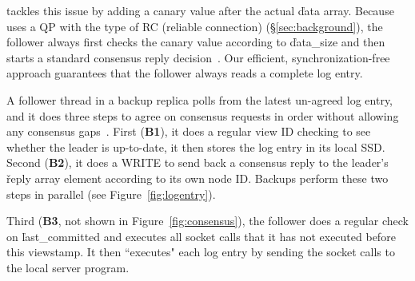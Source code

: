 \xxx tackles this issue by adding a canary value after the actual \v{data} 
array. Because \xxx uses a QP with the type of RC (reliable connection) 
(\S\ref{sec:background}), the follower always first checks the canary value 
according to \v{data\_size} and then starts a standard \paxos consensus reply 
decision~\cite{paxos:practical}. Our efficient, synchronization-free approach 
guarantees that the follower always reads a complete log entry.
% 

A follower thread in a backup replica polls from the latest un-agreed log 
entry, and it does three steps to agree on consensus requests in order without 
allowing any consensus gaps~\cite{paxos:practical}. First (\textbf{B1}), it 
does a regular \paxos view ID checking to see whether the leader is up-to-date, 
it then stores the log entry in its local SSD. Second (\textbf{B2}), it does a 
WRITE to send back a consensus reply to the leader's \v{reply} array element 
according to its own node ID. Backups perform these two steps in parallel 
(see Figure~\ref{fig:logentry}).

Third (\textbf{B3}, not shown in Figure~\ref{fig:consensus}), the follower 
does a regular \paxos check on \v{last\_committed} and executes all socket 
calls that it has not executed before this viewstamp. It then ``executes" each 
log entry by sending the socket calls to the local server program.



